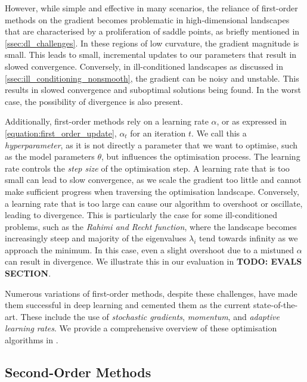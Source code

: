 However, while simple and effective in many scenarios, the reliance of first-order methods on the gradient becomes problematic in high-dimensional landscapes that are characterised by a proliferation of saddle points, as briefly mentioned in \cref{ssec:dl_challenges}. In these regions of low curvature, the gradient magnitude is small. This leads to small, incremental updates to our parameters that result in slowed convergence. Conversely, in ill-conditioned landscapes as discussed in \cref{ssec:ill_conditioning_nonsmooth}, the gradient can be noisy and unstable. This results in slowed convergence and suboptimal solutions being found. In the worst case, the possibility of divergence is also present. 




Additionally, first-order methods rely on a learning rate $\alpha$, or as expressed in \cref{equation:first_order_update}, $\alpha_t$ for an iteration $t$. We call this a \textit{hyperparameter}, as it is not directly a parameter that we want to optimise, such as the model parameters $\theta$, but influences the optimisation process. The learning rate controls the \textit{step size} of the optimisation step. A learning rate that is too small can lead to slow convergence, as we scale the gradient too little and cannot make sufficient progress when traversing the optimisation landscape. Conversely, a learning rate that is too large can cause our algorithm to overshoot or oscillate, leading to divergence. This is particularly the case for some ill-conditioned problems, such as the \textit{Rahimi and Recht function}, where the landscape becomes increasingly steep and majority of the eigenvalues $\lambda_i$ tend towards infinity as we approach the minimum. In this case, even a slight overshoot due to a mistuned $\alpha$ can result in divergence. We illustrate this in our evaluation in \textbf{TODO: EVALS SECTION}. 



Numerous variations of first-order methods, despite these challenges, have made them successful in deep learning and cemented them as the current state-of-the-art. These include the use of \textit{stochastic gradients}, \textit{momentum}, and \textit{adaptive learning rates}. We provide a comprehensive overview of these optimisation algorithms in .



\subsection{Second-Order Methods}

